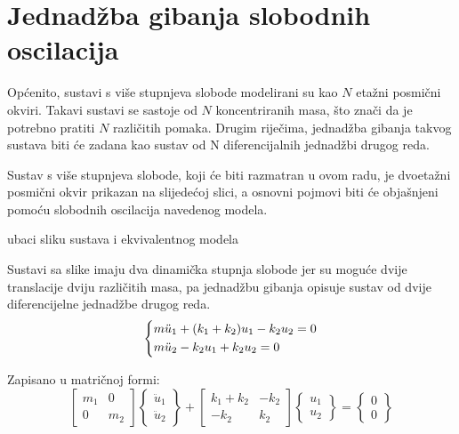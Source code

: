 \documentclass{rgn}
\begin{document}
\section{Jednadžba gibanja slobodnih oscilacija}\label{slobodne_oscilacije}
Općenito, sustavi s više stupnjeva slobode modelirani su kao $N$ etažni posmični
okviri. Takavi sustavi se sastoje od $N$ koncentriranih masa, što znači da je potrebno 
pratiti $N$ različitih pomaka. Drugim riječima, jednadžba gibanja takvog sustava biti će
zadana kao sustav od N diferencijalnih jednadžbi drugog reda.
\par

Sustav s više stupnjeva slobode, koji će biti razmatran u ovom radu, je dvoetažni
posmični okvir prikazan na slijedećoj slici, a osnovni pojmovi biti će objašnjeni
pomoću slobodnih oscilacija navedenog modela.

\par
ubaci sliku sustava i ekvivalentnog modela
\par

Sustavi sa slike imaju dva dinamička stupnja slobode jer su moguće dvije translacije
dviju različitih masa, pa jednadžbu gibanja opisuje sustav od dvije diferencijelne
jednadžbe drugog reda.
\begin{equation}\label{eq:sustav_diferencijalnih}
    \begin{dcases}
        m\ddot{u}_1 + (k_1+k_2)u_1 -k_2u_2 = 0\\
        m\ddot{u}_2 - k_2u_1 + k_2 u_2 = 0
    \end{dcases}
\end{equation}

Zapisano u matričnoj formi:
\begin{equation}\label{eq:sustav_diferencijalnih_matricno}
    \begin{bmatrix}
        m_1 & 0 \\
        0   & m_2
    \end{bmatrix}
    \begin{Bmatrix}
        \ddot{u}_1\\
        \ddot{u}_2
    \end{Bmatrix}
    +
    \begin{bmatrix}
        k_1+k_2 & -k_2\\
        -k_2 & k_2
    \end{bmatrix}
    \begin{Bmatrix}
        u_1\\
        u_2
    \end{Bmatrix}
    =
    \begin{Bmatrix}
        0\\
        0
    \end{Bmatrix}
\end{equation}
\end{document}
